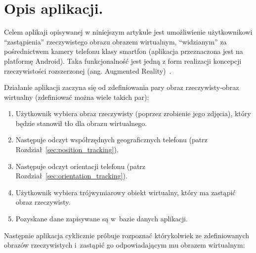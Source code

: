 \documentclass[a4paper,twocolumn,11pt]{article}
\begin{document}

\section{Opis aplikacji.} \label{sec:app_description}

Celem aplikaji opisywanej w niniejszym artykule jest umożliwienie użytkownikowi ``zastąpienia'' rzeczywistego obrazu obrazem wirtualnym, ``widzianym'' za pośrednictwem kamery telefonu klasy smartfon (aplikacja przeznaczona jest na platformę Android).
Taka funkcjonalność jest jedną z form realizacji koncepcji rzeczywistości rozszerzonej (ang. Augmented Reality)~\cite{aug:real}.

Działanie aplikacji zaczyna się od zdefiniowania pary obraz rzeczywisty-obraz wirtualny (zdefiniować można wiele takich par):

\begin{enumerate}
 \item Użytkownik wybiera obraz rzeczywisty (poprzez zrobienie jego zdjęcia), który będzie stanowił tło dla obrazu wirtualnego.
 \item Następuje odczyt współrzędnych geograficznych telefonu (patrz Rozdział~\ref{sec:position_tracking}).
 \item Następuje odczyt orientacji telefonu (patrz Rozdział~\ref{sec:orientation_tracking}).
 \item Użytkownik wybiera trójwymiarowy obiekt wirtualny, który ma zastąpić obraz rzeczywisty.
 \item Pozyskane dane zapisywane są w~bazie danych aplikacji.
\end{enumerate}

Następnie aplikacja cyklicznie próbuje rozpoznać którykolwiek ze zdefiniowanych obrazów rzeczywistych i~zastąpić go odpowiadającym mu obrazem wirtualnym:
\end{document}

